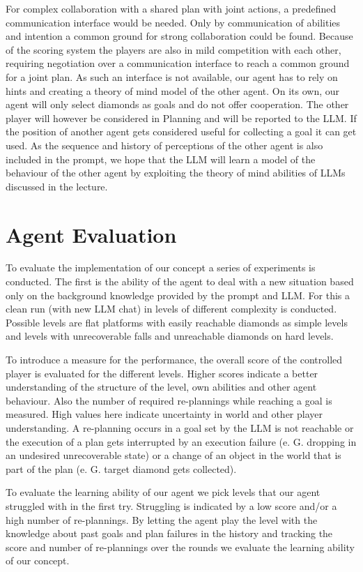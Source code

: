 \documentclass{article}
\begin{document}
For complex collaboration with a shared plan with joint actions, a predefined communication interface would be needed. 
Only by communication of abilities and intention a common ground for strong collaboration could be found. 
Because of the scoring system the players are also in mild competition with each other, requiring negotiation over a communication interface to reach a common ground for a joint plan.  
As such an interface is not available, our agent has to rely on hints and creating a theory of mind model of the other agent. 
On its own, our agent will only select diamonds as goals and do not offer cooperation. The other player will however be considered in Planning and will be reported to the LLM. If the position of another agent gets considered useful for collecting a goal it can get used. As the sequence and history of perceptions of the other agent is also included in the prompt, we hope that the LLM will learn a model of the behaviour of the other agent by exploiting the theory of mind abilities of LLMs discussed in the lecture.

\section{Agent Evaluation}

To evaluate the implementation of our concept a series of experiments is conducted.
The first is the ability of the agent to deal with a new situation based only on the background knowledge provided by the prompt and LLM. For this a clean run (with new LLM chat) in levels of different complexity is conducted.
Possible levels are flat platforms with easily reachable diamonds as simple levels and levels with unrecoverable falls and unreachable diamonds on hard levels. 

To introduce a measure for the performance, the overall score of the controlled player is evaluated for the different levels.
Higher scores indicate a better understanding of the structure of the level, own abilities and other agent behaviour.
Also the number of required re-plannings while reaching a goal is measured. High values here indicate uncertainty in world and other player understanding. A re-planning occurs in a goal set by the LLM is not reachable or the execution of a plan gets interrupted by an execution failure (e. G. dropping in an undesired unrecoverable state) or a change of an object in the world that is part of the plan (e. G. target diamond gets collected).

To evaluate the learning ability of our agent we pick levels that our agent struggled with in the first try. Struggling is indicated by a low score and/or a high number of re-plannings. By letting the agent play the level with the knowledge about past goals and plan failures in the history and tracking the score and number of re-plannings over the rounds we evaluate the learning ability of our concept.
\end{document}
